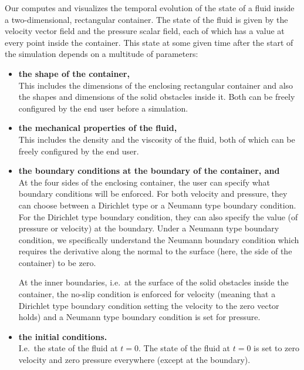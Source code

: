 \documentclass[11pt,a4paper,twoside,openright]{report}
\begin{document}
Our \software{} computes and visualizes the temporal evolution of the state of a fluid inside a two-dimensional, rectangular container. The state of the fluid is given by the velocity vector field and the pressure scalar field, each of which has a value at every point inside the container. This state at some given time after the start of the simulation depends on a multitude of parameters:
\begin{itemize}
	\item \textbf{the shape of the container,}\\
		This includes the dimensions of the enclosing rectangular container and also the shapes and dimensions of the solid obstacles inside it. Both can be freely configured by the end user before a simulation.
	\item \textbf{the mechanical properties of the fluid,}\\
		This includes the density and the viscosity of the fluid, both of which can be freely configured by the end user.
	\item \textbf{the boundary conditions at the boundary of the container, and}\\
		At the four sides of the enclosing container, the user can specify what boundary conditions will be enforced. For both velocity and pressure, they can choose between a Dirichlet type or a Neumann type boundary condition. For the Dirichlet type boundary condition, they can also specify the value (of pressure or velocity) at the boundary. Under a Neumann type boundary condition, we specifically understand the Neumann boundary condition which requires the derivative along the normal to the surface (here, the side of the container) to be zero.
		\vxlisp

		At the inner boundaries, i.e.\ at the surface of the solid obstacles inside the container, the no-slip condition is enforced for velocity (meaning that a Dirichlet type boundary condition setting the velocity to the zero vector holds) and a Neumann type boundary condition is set for pressure.
	\item \textbf{the initial conditions.}\\
		I.e.\ the state of the fluid at $t=0$. The state of the fluid at $t=0$ is set to zero velocity and zero pressure everywhere (except at the boundary).
\end{itemize}
\end{document}
